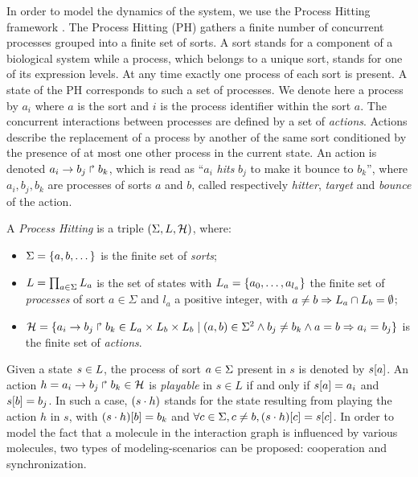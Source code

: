 
In order to model the dynamics of the system, we use the Process Hitting framework \cite{PMR10-TCSB}.
The Process Hitting (PH) gathers a finite number of concurrent processes grouped into a finite set of sorts.
A sort stands for a component of a biological system while a process, which belongs to a unique sort, stands
for one of its expression levels. At any time exactly one process of each sort is present. A state of the 
PH corresponds to such a set of processes. We denote here a process by $a_i$ where $a$ 
is the sort and $i$ is the process identifier within the sort $a$.
The concurrent interactions between processes are defined by a set of \emph{actions}.
Actions describe the replacement of a process by another of the same sort conditioned by the presence 
of at most one other process in the current state. An action is denoted  $a_i\rightarrow b_j\Rsh b_k$, 
which is read as ``$a_i$ \emph{hits} $b_j$ to make it bounce to $b_k$'', where $a_i,b_j,b_k$ are 
processes of sorts $a$ and $b$, called respectively \emph{hitter}, \emph{target} and \emph{bounce} of 
the action.

\begin{definition} \label{def:PH}
A \emph{Process Hitting} is a triple $(\Sigma,L,\mathcal{H})$, where:
\begin{itemize}
\item $\Sigma = \{a,b,\dots\}$ is the finite set of \emph{sorts};
\item $L = \prod_{a\in\Sigma} L_a$ is the set of states with $L_a = \{a_0,\dots,a_{l_a}\}$
the finite set of \emph{processes} of sort $a\in\Sigma$ and $l_a$ a positive integer, with $a\neq b\Rightarrow L_a \cap L_b = \emptyset$;
\item $\mathcal{H} = \{ a_i\rightarrow b_j\Rsh b_k \in L_a \times L_b \times L_b \mid (a,b) \in \Sigma^2
  \wedge b_j\neq b_k \wedge a=b\Rightarrow a_i=b_j\}$ is the finite set of \emph{actions}.
\end{itemize}
\end{definition}

\noindent
Given a state $s\in L$, the process of sort $a\in\Sigma$ present in $s$ is denoted by ${s[a]}$.
An action $h=a_i\rightarrow b_j\Rsh b_k \in \mathcal{H}$ is \emph{playable} in $s \in L$ if and only if ${s[a]}=a_i$ and ${s[b]} = b_j$.
In such a case, $(s\cdot h)$ stands for the state resulting from playing the action $h$ in $s$, with
${(s\cdot h)[b]} = b_k$ and $\forall c \in \Sigma, c \neq b, {(s\cdot h)[c]} = {s[c]}$.
In order to model the fact that a molecule in the interaction graph is influenced by various molecules, two 
types of modeling-scenarios can be proposed: cooperation and synchronization.

